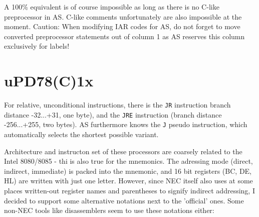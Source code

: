 \documentclass[12pt,twoside]{report}
\newcommand{\tty}[1]{{\tt #1}}
\begin{document}
A 100\% equivalent is of course impossible as long as there is no C-like
preprocessor in AS.  C-like comments unfortunately are also impossible
at the moment.  Caution: When modifying IAR codes for AS, do not forget to
move converted preprocessor statements out of column 1 as AS reserves this
column exclusively for labels!


\section{uPD78(C)1x}
\label{78C1xSpec}

For relative, unconditional instructions, there is the \tty{JR} instruction
branch distance -32...+31, one byte), and the \tty{JRE} instruction (branch
distance -256...+255, two bytes).  AS furthermore knows the \tty{J} pseudo
instruction, which automatically selects the shortest possible variant.

Architecture and instructon set of these processors are coarsely
related to the Intel 8080/8085 - thi is also true for the
mnemonics.  The adressing mode (direct, indirect, immediate) is
packed into the mnemonic, and 16 bit registers (BC, DE, HL) are
written with just one letter.  However, since NEC itself also
uses at some places written-out register names and parentheses to
signify indirect addressing, I decided to support some
alternative notations next to the 'official' ones.   Some non-NEC
tools like disassemblers seem to use these notations either:
\end{document}
